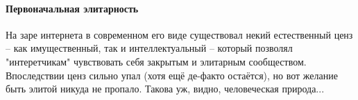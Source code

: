 \paragraph{Первоначальная элитарность}

На заре интернета в современном его виде существовал некий естественный ценз -- как имущественный, так и интеллектуальный -- который позволял "интеретчикам" чувствовать себя закрытым и элитарным сообществом. Впоследствии ценз сильно упал (хотя ещё де-факто остаётся), но вот желание быть элитой никуда не пропало. Такова уж, видно, человеческая природа...




